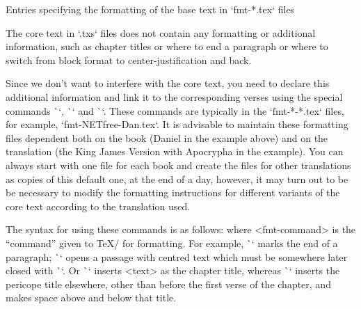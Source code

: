 {\secc[fmt] Entries specifying the formatting of the base text in `fmt-*.tex` files

The core text in `.txs` files does not contain any formatting or additional information, 
such as chapter titles or where to end a paragraph or where to switch from block format 
to center-justification   and back.


Since we don't want to interfere with the core text,  
you need to declare this 
additional information and link it to the corresponding verses using the special 
commands \`\fmtadd`, \`\fmtpre` and \`\fmtins`. 
These commands are typically in the `fmt-*-*.tex` files,
for example, `fmt-NETfree-Dan.tex`. It is advisable to maintain these formatting files
dependent both on the book (Daniel in the example above) and on the
translation (the King James Version with Apocrypha in the example). 
You can always  start with one file for each book and  create the files for  other translations as copies of this default one,  at the end of a day, however,
it may turn out to be be necessary to modify the formatting instructions
for different variants of the core text according to the translation used.


The syntax for using these commands is as follows:
\begtt
{}
\endtt
where <fmt-command> is the ``command'' given to \TeX/ for formatting.
For example, \`\endgraf` marks the end of a paragraph; \`\begcenter` opens a passage with
centred text which must be somewhere later closed  with \`\endcenter`. Or 
\`` inserts <text> as the chapter title, whereas
\`` inserts the pericope title elsewhere, other than before the first verse of the chapter, and makes space above and below that title.

}
